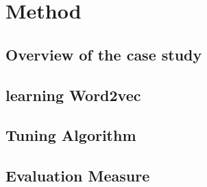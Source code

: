 \section{Method}
\subsection{Overview of the case study}
\subsection{learning Word2vec}
\subsection{Tuning Algorithm}
\subsection{Evaluation Measure}